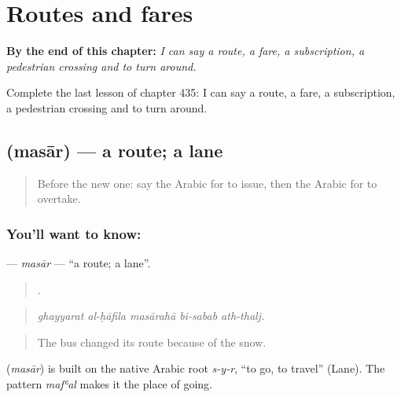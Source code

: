 
\chapter{Routes and fares}
\label{ch:ar-routes-and-fares}

\begin{chapteropening}
\textbf{By the end of this chapter:} \emph{I can say a route, a fare, a subscription, a pedestrian crossing and to turn around.}

Complete the last lesson of chapter 435: I can say a route, a fare, a subscription, a pedestrian crossing and to turn around.
\end{chapteropening}

\section[\texorpdfstring{\ar{مسار} (masār)}{مسار (masār)}]{ (masār) — a route; a lane}

\label{lesson:AR-C435-masar}



\begin{quote}
Before the new one: say the Arabic for to issue, then the Arabic for to overtake.
\end{quote}

\subsection*{You'll want to know: }
\textbf{} — \emph{masār} — \textquotedblleft{}a route; a lane\textquotedblright{}.

\begin{quote}
    .
\end{quote}

\begin{quote}
\emph{ghayyarat al-ḥāfila masārahā bi-sabab ath-thalj.}
\end{quote}

\begin{quote}
The bus changed its route because of the snow.
\end{quote}

\begin{cousinweb}
\textbf{} (\emph{masār}) is built on the native Arabic root \emph{s-y-r}, \textquotedblleft{}to go, to travel\textquotedblright{} (Lane). The pattern \emph{mafʿal} makes it the place of going.
\end{cousinweb}


